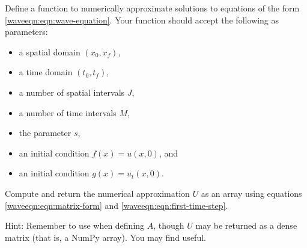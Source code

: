\begin{problem}
    \label{waveeqn:prob:solve_wave}
    Define a function  to numerically approximate solutions to equations of the form \eqref{waveeqn:eqn:wave-equation}.
    Your function should accept the following as parameters:
    \begin{itemize}
        \item a spatial domain $(x_0, x_f)$,
        \item a time domain $(t_0, t_f)$,
        \item a number of spatial intervals $J$,
        \item a number of time intervals $M$,
        \item the parameter $s$,
        \item an initial condition $f(x) = u(x, 0)$, and
        \item an initial condition $g(x) = u_t(x, 0)$.
    \end{itemize}
    Compute and return the numerical approximation $U$ as an array using equations \eqref{waveeqn:eqn:matrix-form} and \eqref{waveeqn:eqn:first-time-step}.

	Hint: Remember to use  when defining $A$, though $U$ may be returned as a dense matrix (that is, a NumPy array).
	You may find  useful.
\end{problem}

